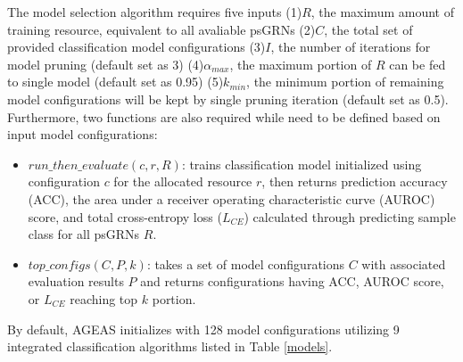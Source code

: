 \documentclass[fleqn,10pt]{wlscirep}
\begin{document}
    The model selection algorithm requires five inputs
    (1)$R$, the maximum amount of training resource, equivalent to all avaliable psGRNs
    (2)$C$, the total set of provided classification model configurations
    (3)$I$, the number of iterations for model pruning (default set as 3)
    (4)$\alpha_{max}$, the maximum portion of $R$ can be fed to single model (default set as 0.95)
    (5)$k_{min}$, the minimum portion of remaining model configurations will be kept by single pruning iteration (default set as 0.5).
    Furthermore, two functions are also required while need to be defined based on input model configurations:
    \begin{itemize}
    \setlength\itemsep{0em}
    \item \textbf{$run\_then\_evaluate(c, r, R)$}: trains classification model initialized using configuration $c$ for the allocated resource $r$, then returns prediction accuracy (ACC), the area under a receiver operating characteristic curve (AUROC)\cite{hanley_mcneil_1982} score, and total cross-entropy loss ($L_{CE}$) calculated through predicting sample class for all psGRNs $R$.

    \item \textbf{$top\_configs(C, P, k)$}: takes a set of model configurations $C$ with associated evaluation results $P$ and returns configurations having ACC, AUROC score, or $L_{CE}$ reaching top $k$ portion.
    \end{itemize}

    \noindent By default, AGEAS initializes with 128 model configurations utilizing 9 integrated classification algorithms listed in Table \ref{models}.
\end{document}

